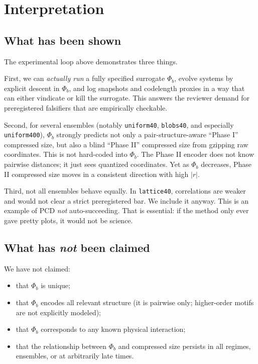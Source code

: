 \documentclass[11pt,a4paper]{article}
\numberwithin{equation}{section}
\newcommand{\phib}{\Phi_b}
\begin{document}
\clearpage

\section{Interpretation}
\subsection{What has been shown}
The experimental loop above demonstrates three things.

First, we can \emph{actually run} a fully specified surrogate $\phib$, evolve systems by explicit descent in $\phib$, and log snapshots and codelength proxies in a way that can either vindicate or kill the surrogate. This answers the reviewer demand for preregistered falsifiers that are empirically checkable.

Second, for several ensembles (notably \texttt{uniform40}, \texttt{blobs40}, and especially \texttt{uniform400}), $\phib$ strongly predicts not only a pair-structure-aware ``Phase I'' compressed size, but also a blind ``Phase II'' compressed size from gzipping raw coordinates. This is not hard-coded into $\phib$. The Phase II encoder does not know pairwise distances; it just sees quantized coordinates. Yet as $\phib$ decreases, Phase II compressed size moves in a consistent direction with high $|r|$.

Third, not all ensembles behave equally. In \texttt{lattice40}, correlations are weaker and would not clear a strict preregistered bar. We include it anyway. This is an example of PCD \emph{not} auto-succeeding. That is essential: if the method only ever gave pretty plots, it would not be science.

\subsection{What has \emph{not} been claimed}
We have not claimed:
\begin{itemize}
\item that $\phib$ is unique;
\item that $\phib$ encodes all relevant structure (it is pairwise only; higher-order motifs are not explicitly modeled);
\item that $\phib$ corresponds to any known physical interaction;
\item that the relationship between $\phib$ and compressed size persists in all regimes, ensembles, or at arbitrarily late times.
\end{itemize}
\end{document}
